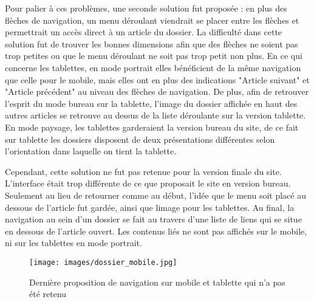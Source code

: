 \documentclass[12pt,a4paper]{article}
\begin{document}
Pour palier à ces problèmes, une seconde solution fut proposée : en plus des flèches de navigation, un menu déroulant viendrait se placer entre les flèches et permettrait un accès direct à un article du dossier. La difficulté dans cette solution fut de trouver les bonnes dimensions afin que des flèches ne soient pas trop petites ou que le menu déroulant ne soit pas trop petit non plus. En ce qui concerne les tablettes, en mode portrait elles bénéficient de la même navigation que celle pour le mobile, mais elles ont en plus des indications "Article suivant" et "Article précédent" au niveau des flèches de navigation. De plus, afin de retrouver l'esprit du mode bureau sur la tablette, l'image du dossier affichée en haut des autres articles se retrouve au dessus de la liste déroulante sur la version tablette. En mode paysage, les tablettes garderaient la version bureau du site, de ce fait sur tablette les dossiers disposent de deux présentations différentes selon l'orientation dans laquelle on tient la tablette.\par
Cependant, cette solution ne fut pas retenue pour la version finale du site. L'interface était trop différente de ce que proposait le site en version bureau. Seulement au lieu de retourner comme au début, l'idée que le menu soit placé au dessous de l'article fut gardée, ainsi que limage pour les tablettes. Au final, la navigation au sein d'un dossier se fait au travers d'une liste de liens qui se situe en dessous de l'article ouvert. Les contenus liés ne sont pas affichés sur le mobile, ni sur les tablettes en mode portrait.\par

\begin{figure}[h!]
\centering\texttt{[image: images/dossier\_mobile.jpg]} 
\caption{Dernière proposition de navigation sur mobile et tablette qui n'a pas été retenu}
\end{figure}

\newpage
\end{document}
